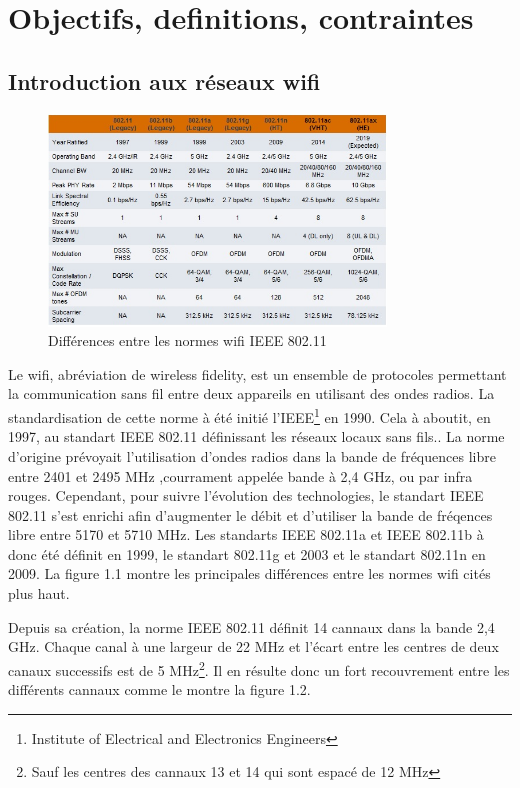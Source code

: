 \chapter{Objectifs, definitions, contraintes}
\section{Introduction aux réseaux wifi}

\begin{figure}
   \centering
   \includegraphics[width=0.8\textwidth,natwidth=488,natheight=513]{images/diffwifi.jpg}
   \caption{Différences entre les normes wifi IEEE 802.11}
\end{figure}
Le wifi, abréviation de wireless fidelity, est un ensemble de protocoles permettant la communication sans fil entre deux
appareils en utilisant des ondes radios. La standardisation de cette norme à été initié l'IEEE\footnote{Institute of Electrical and Electronics Engineers}
en 1990. Cela à aboutit, en 1997, au standart IEEE 802.11 définissant les réseaux locaux sans fils.\cite{WFintro}. La norme
d'origine prévoyait l'utilisation d'ondes radios dans la bande de fréquences libre entre 2401 et 2495 MHz\cite{WFband}
,courrament appelée bande à 2,4 GHz, ou par infra rouges.
Cependant, pour suivre l'évolution des technologies, le standart IEEE 802.11 s'est enrichi afin d'augmenter le débit et
d'utiliser la bande de fréqences libre entre 5170 et 5710 MHz.
Les standarts IEEE 802.11a et IEEE 802.11b à donc été définit en 1999, le standart 802.11g et 2003 et le standart 802.11n
en 2009. La figure 1.1 montre les principales différences entre les normes wifi cités plus haut.\cite{WFevol}

Depuis sa création, la norme IEEE 802.11 définit 14 cannaux dans la bande 2,4 GHz. Chaque canal à une largeur de 22 MHz et 
l'écart entre les centres de deux canaux successifs est de 5 MHz\footnote{Sauf les centres des cannaux 13 et 14 qui sont espacé
de 12 MHz}. Il en résulte donc un fort recouvrement entre les différents cannaux comme le montre la figure 1.2.

